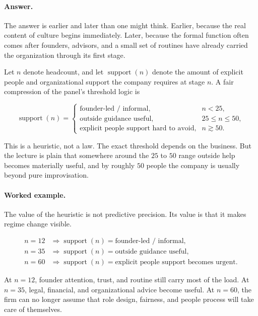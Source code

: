\paragraph{Answer.} The answer is earlier and later than one might think. Earlier, because the real content of culture begins immediately. Later, because the formal function often comes after founders, advisors, and a small set of routines have already carried the organization through its first stage.

Let \(n\) denote headcount, and let \(\operatorname{support}(n)\) denote the amount of explicit people and organizational support the company requires at stage \(n\). A fair compression of the panel's threshold logic is

\begin{equation}
\operatorname{support}(n)=
\begin{cases}
\text{founder-led / informal}, & n<25,\\
\text{outside guidance useful}, & 25\le n\le 50,\\
\text{explicit people support hard to avoid}, & n\gtrsim 50.
\end{cases}
\end{equation}

This is a heuristic, not a law. The exact threshold depends on the business. But the lecture is plain that somewhere around the \(25\) to \(50\) range outside help becomes materially useful, and by roughly \(50\) people the company is usually beyond pure improvisation.

\paragraph{Worked example.} The value of the heuristic is not predictive precision. Its value is that it makes regime change visible.

\begin{align}
n=12 &\Rightarrow \operatorname{support}(n)=\text{founder-led / informal},\\
n=35 &\Rightarrow \operatorname{support}(n)=\text{outside guidance useful},\\
n=60 &\Rightarrow \operatorname{support}(n)=\text{explicit people support becomes urgent}.
\end{align}

At \(n=12\), founder attention, trust, and routine still carry most of the load. At \(n=35\), legal, financial, and organizational advice become useful. At \(n=60\), the firm can no longer assume that role design, fairness, and people process will take care of themselves.

